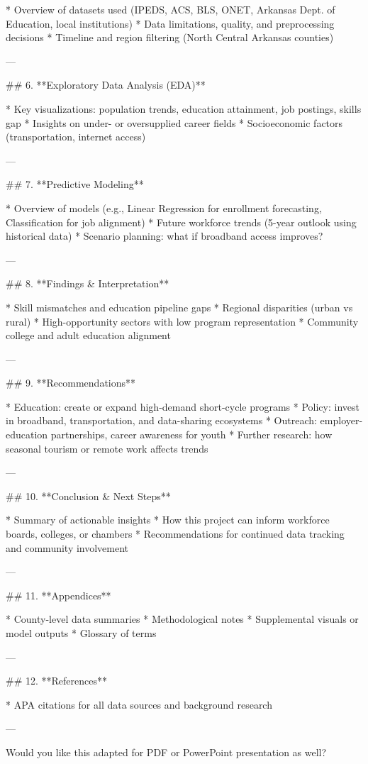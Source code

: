* Overview of datasets used (IPEDS, ACS, BLS, O\*NET, Arkansas Dept. of Education, local institutions)
* Data limitations, quality, and preprocessing decisions
* Timeline and region filtering (North Central Arkansas counties)

---

## 6. **Exploratory Data Analysis (EDA)**

* Key visualizations: population trends, education attainment, job postings, skills gap
* Insights on under- or oversupplied career fields
* Socioeconomic factors (transportation, internet access)

---

## 7. **Predictive Modeling**

* Overview of models (e.g., Linear Regression for enrollment forecasting, Classification for job alignment)
* Future workforce trends (5-year outlook using historical data)
* Scenario planning: what if broadband access improves?

---

## 8. **Findings & Interpretation**

* Skill mismatches and education pipeline gaps
* Regional disparities (urban vs rural)
* High-opportunity sectors with low program representation
* Community college and adult education alignment

---

## 9. **Recommendations**

* Education: create or expand high-demand short-cycle programs
* Policy: invest in broadband, transportation, and data-sharing ecosystems
* Outreach: employer-education partnerships, career awareness for youth
* Further research: how seasonal tourism or remote work affects trends

---

## 10. **Conclusion & Next Steps**

* Summary of actionable insights
* How this project can inform workforce boards, colleges, or chambers
* Recommendations for continued data tracking and community involvement

---

## 11. **Appendices**

* County-level data summaries
* Methodological notes
* Supplemental visuals or model outputs
* Glossary of terms

---

## 12. **References**

* APA citations for all data sources and background research

---

Would you like this adapted for PDF or PowerPoint presentation as well?
